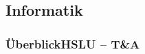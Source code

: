 \subsection{Informatik}

\author{Alexander Suter}

\begin{frame}\frametitle{Überblick\hfill{}\footnotesize HSLU -- T\&A}
	
\end{frame}
